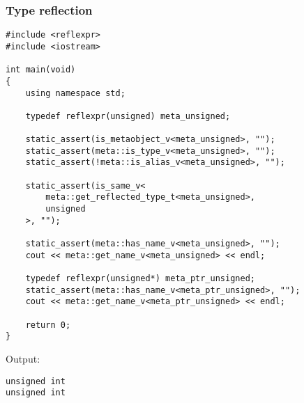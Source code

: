 \subsubsection{Type reflection}

\begin{verbatim}
#include <reflexpr>
#include <iostream>

int main(void)
{
	using namespace std;

	typedef reflexpr(unsigned) meta_unsigned;

	static_assert(is_metaobject_v<meta_unsigned>, "");
	static_assert(meta::is_type_v<meta_unsigned>, "");
	static_assert(!meta::is_alias_v<meta_unsigned>, "");

	static_assert(is_same_v<
		meta::get_reflected_type_t<meta_unsigned>,
		unsigned
	>, "");

	static_assert(meta::has_name_v<meta_unsigned>, "");
	cout << meta::get_name_v<meta_unsigned> << endl;

	typedef reflexpr(unsigned*) meta_ptr_unsigned;
	static_assert(meta::has_name_v<meta_ptr_unsigned>, "");
	cout << meta::get_name_v<meta_ptr_unsigned> << endl;

	return 0;
}
\end{verbatim}

Output:

\begin{verbatim}
unsigned int
unsigned int
\end{verbatim}

